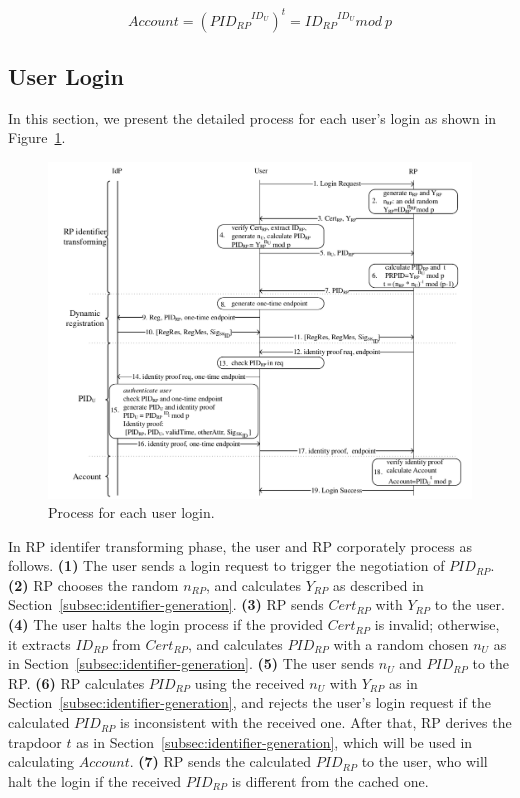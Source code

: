  \begin{equation}
   Account = ({PID_{RP}}^{ID_U})^t = {ID_{RP}}^{ID_U} mod \ p
   \label{equ:account}
   \end{equation}


\subsection{User Login}
\label{sebsec:loginprocess}
In this section, we present the detailed process for each user's login as shown in Figure~\ref{fig:process}. %

\begin{figure}
  \centering
  \includegraphics[width=0.85\linewidth]{fig/process.pdf}
  \caption{Process for each user login.}
  \label{fig:process}
\end{figure}

In RP identifer transforming phase, the user and RP corporately process as follows. \textbf{(1)} The user sends a login request to trigger the negotiation of $PID_{RP}$. \textbf{(2)} RP chooses the random $n_{RP}$, and calculates $Y_{RP}$ as described in Section~\ref{subsec:identifier-generation}. \textbf{(3)} RP sends $Cert_{RP}$ with $Y_{RP}$ to the user.  \textbf{(4)} The user halts the login process if the provided $Cert_{RP}$ is invalid; otherwise, it extracts $ID_{RP}$ from $Cert_{RP}$, and calculates $PID_{RP}$ with a random chosen $n_U$ as in Section~\ref{subsec:identifier-generation}. \textbf{(5)} The user sends $n_U$ and $PID_{RP}$ to the RP. \textbf{(6)} RP calculates $PID_{RP}$ using the received $n_U$ with $Y_{RP}$ as in Section~\ref{subsec:identifier-generation}, and rejects the user's login request if the calculated $PID_{RP}$ is inconsistent with the received one. After that, RP derives the trapdoor $t$ as in Section~\ref{subsec:identifier-generation}, which will be used in calculating $Account$. \textbf{(7)} RP sends the calculated $PID_{RP}$ to the user, who will halt the login if the received $PID_{RP}$ is different from the cached one.

